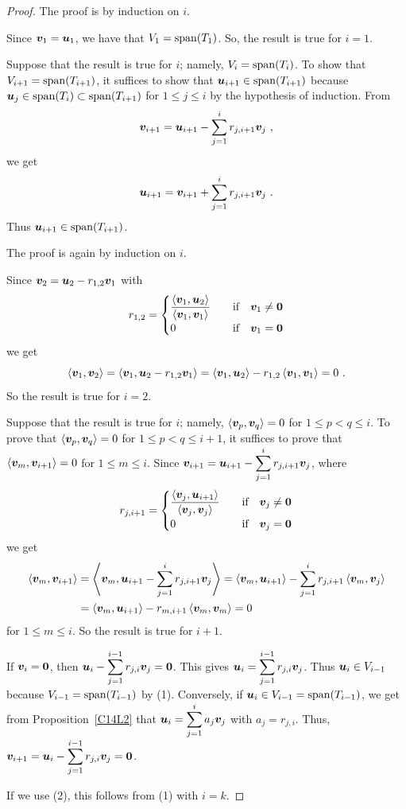 \begin{proof}
 The proof is by induction on $i$.

Since $\bm{v}_1 = \bm{u}_1$, we have that $V_1 = \operatorname{span}(T_1)$.  So,
the result is true for $i=1$.

Suppose that the result is true for $i$; namely, $V_i = \operatorname{span}(T_i)$.
To show that $V_{i+1} = \operatorname{span}(T_{i+1})$, it suffices to show that
$\bm{u}_{i+1} \in \operatorname{span}(T_{i+1})$ because
$\bm{u}_j \in \operatorname{span}(T_i) \subset \operatorname{span}(T_{i+1})$ for $1 \leq j \leq i$
by the hypothesis of induction.  From
\[
\bm{v}_{i+1} = \bm{u}_{i+1} - \sum_{j=1}^i r_{j,i+1} \bm{v}_j \ ,
\]
we get
\[
\bm{u}_{i+1} = \bm{v}_{i+1} + \sum_{j=1}^i r_{j,i+1} \bm{v}_j \ .
\]
Thus $\bm{u}_{i+1} \in \operatorname{span}(T_{i+1})$.

 The proof is again by induction on $i$.

Since $\bm{v}_2 = \bm{u}_2 - r_{1,2} \bm{v}_1$ with
\[
r_{1,2} = \begin{cases}
\displaystyle \frac{\left\langle{\bm{v}_1} , {\bm{u}_2}\right\rangle}{\left\langle{\bm{v}_1} , {\bm{v}_1}\right\rangle}
& \quad \text{if} \quad \bm{v}_1 \neq \bm{0} \\
0 & \quad \text{if} \quad \bm{v}_1 = \bm{0}
\end{cases}
\]
we get
\[
\left\langle{\bm{v}_1} , {\bm{v}_2}\right\rangle
= \left\langle{\bm{v}_1} , {\bm{u}_2 - r_{1,2} \bm{v}_1}\right\rangle
= \left\langle{\bm{v}_1} , {\bm{u}_2}\right\rangle - r_{1,2} \left\langle{\bm{v}_1} , {\bm{v}_1}\right\rangle
= 0 \ .
\]
So the result is true for $i=2$.

Suppose that the result is true for $i$; namely,
$\left\langle{\bm{v}_p} , {\bm{v}_q}\right\rangle = 0$ for $1 \leq p < q \leq i$.  To prove
that $\left\langle{\bm{v}_p} , {\bm{v}_q}\right\rangle = 0$ for $1 \leq p < q \leq i+1$, it
suffices to prove that
$\left\langle{\bm{v}_m} , {\bm{v}_{i+1}}\right\rangle = 0$ for $1 \leq m \leq i$.
Since
$\displaystyle \bm{v}_{i+1} = \bm{u}_{i+1} - \sum_{j=1}^ir_{j,i+1}\bm{v}_j$,
where
\[
r_{j,i+1} = \begin{cases}
\displaystyle \frac{\left\langle{\bm{v}_j} , {\bm{u}_{i+1}}\right\rangle}{\left\langle{\bm{v}_j} , {\bm{v}_j}\right\rangle}
& \quad \text{if} \quad \bm{v}_j \neq \bm{0} \\
0 & \quad \text{if} \quad \bm{v}_j = \bm{0}
\end{cases}
\]
we get
\begin{align*}
\left\langle{\bm{v}_m} , {\bm{v}_{i+1}}\right\rangle
&= \left\langle{\bm{v}_m} , {\bm{u}_{i+1} - \sum_{j=1}^ir_{j,i+1}\bm{v}_j}\right\rangle
= \left\langle{\bm{v}_m} , {\bm{u}_{i+1}}\right\rangle -
\sum_{j=1}^ir_{j,i+1}\left\langle{\bm{v}_m} , {\bm{v}_j}\right\rangle \\
&= \left\langle{\bm{v}_m} , {\bm{u}_{i+1}}\right\rangle - r_{m,i+1}\left\langle{\bm{v}_m} , {\bm{v}_m}\right\rangle
= 0
\end{align*}
for $1 \leq m \leq i$.   So the result is true for $i+1$.

  If $\bm{v}_i = \bm{0}$, then
$\displaystyle \bm{u}_i - \sum_{j=1}^{i-1}r_{j,i}\bm{v}_j = \bm{0}$.
This gives
$\displaystyle \bm{u}_i = \sum_{j=1}^{i-1}r_{j,i}\bm{v}_j$.  Thus
$\bm{u}_i \in V_{i-1}$ because $V_{i-1} = \operatorname{span}(T_{i-1})$ by (1).
Conversely, if $\bm{u}_i \in V_{i-1} = \operatorname{span}(T_{i-1})$, we get from
Proposition~\ref{C14L2} that
$\displaystyle \bm{u}_i = \sum_{j=1}^i a_j \bm{v}_j$ with
$a_j = r_{j,i}$.  Thus,
$\displaystyle \bm{v}_{i+1} = \bm{u}_i - \sum_{j=1}^{i-1}r_{j,i}\bm{v}_j
= \bm{0}$.

 If we use (2), this follows from (1) with $i=k$.
\end{proof}

